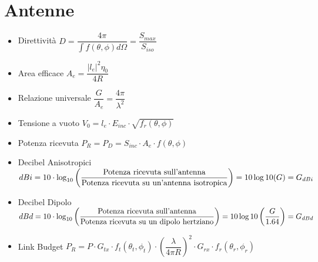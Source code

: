 \documentclass{article}
\begin{document}
\section{Antenne}
\begin{itemize}
	\item Direttività \( \displaystyle D = \dfrac{4 \pi}{\int{f(\theta, \phi) d \Omega}} = \dfrac{S_{max}}{S_{iso}} \)
	\item Area efficace \( \displaystyle A_e = \dfrac{|l_e| ^ 2 \eta_0}{4 R} \)
	\item Relazione universale \( \dfrac{G}{A_e} = \dfrac{4 \pi}{\lambda^2} \)
	\item Tensione a vuoto \( V_0 = l_e \cdot E_{inc} \cdot \sqrt{f_r(\theta, \phi)} \)
	\item Potenza ricevuta \(P_R = P_D = S_{inc} \cdot A_e \cdot  f(\theta, \phi) \)
	\item Decibel Anisotropici \(dBi = 10 \cdot \log_{10} \left( \dfrac{\textnormal{Potenza ricevuta sull'antenna}}{\textnormal{Potenza ricevuta su un'antenna isotropica}} \right) = 10 \log{10} (G) = G_{dBi}\)
	\item Decibel Dipolo  \(dBd = 10 \cdot \log_{10} \left( \dfrac{\textnormal{Potenza ricevuta sull'antenna}}{\textnormal{Potenza ricevuta su un dipolo hertziano}} \right) = 10 \log{10} \left( \dfrac{G}{1.64} \right) = G_{dBd}\)
	\item Link Budget \(P_R = P \cdot G_{tx} \cdot f_t (\theta_t, \phi_t) \cdot \left( \dfrac{\lambda}{4 \pi R} \right) ^ 2 \cdot G_{rx} \cdot f_r (\theta_r, \phi_r) \)
\end{itemize}
\end{document}
